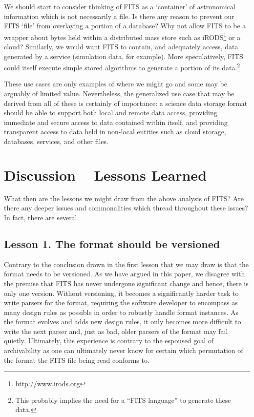 \documentclass[final,authoryear,5p,times,twocolumn]{elsarticle}
\begin{document}
{{We should start to consider thinking of FITS as a `container' of
astronomical information which is not necessarily a file. Is there
any reason to prevent our FITS `file' from overlaying a portion of a
database? Why not allow FITS to be a wrapper about bytes held within a
distributed mass store such as
iRODS\footnote{\url{http://www.irods.org}} \citep[see e.g.,][]{2007AGUFMIN13B1214R}
or a cloud?  Similarly, we would
want FITS to contain, and adequately access, data generated by a
service (simulation data, for example). More speculatively, FITS could
itself execute simple stored algorithms to generate a portion of its
data.\footnote{This probably implies the need for a ``FITS language''
to generate these data.}


These use cases are only examples of where we might go and some may be
arguably of limited value. Nevertheless, the generalized use case that
may be derived from all of these is certainly of importance:
a science data storage format should be able to support both local
and remote data access, providing immediate and secure access to data
contained within itself, and providing transparent access to data held
in non-local entities such as cloud storage, databases, services, and
other files.


\section{Discussion -- Lessons Learned}
\label{sec:discussion}

What then are the lessons we might draw from the above analysis
of FITS? Are there any deeper issues and commonalities which thread 
throughout these issues? In fact, there are several.


\subsection{Lesson 1. The format should be versioned}

Contrary to the conclusion drawn in \citet{1997ASPC..125..257W}
the first lesson that we may draw is that the format needs to be
versioned.
As we have argued in this paper, we disagree with the premise
that FITS has never undergone significant change and hence, there
is only one version. Without versioning, it becomes a significantly
harder task to write parsers for the format, requiring the software
developer to encompass as many design rules as possible in order
to robustly handle format instances. As the format evolves and
adds new design rules, it only becomes more difficult to write the
next parser and, just as bad, older parsers of the format may fail quietly.
Ultimately, this experience is contrary to the espoused goal of
archivability as one can ultimately never know for certain which
permutation of the format the FITS file being read conforms to.


}}
\end{document}

